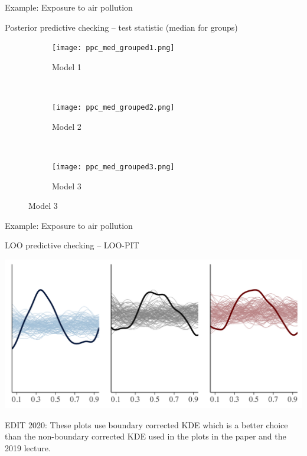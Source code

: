 \documentclass[t]{beamer}
\begin{document}
\begin{frame}

  {\Large\color{navyblue} Example: Exposure to air pollution}


  Posterior predictive checking -- test statistic (median for groups)

  \begin{figure}
\centering
\begin{subfigure}{.31\textwidth}
\texttt{[image: ppc\_med\_grouped1.png]}
\caption{Model 1}
\end{subfigure}
~
\begin{subfigure}{.31\textwidth}
\texttt{[image: ppc\_med\_grouped2.png]}
\caption{Model 2}
\end{subfigure}
~
\begin{subfigure}{.31\textwidth}
\texttt{[image: ppc\_med\_grouped3.png]}
\caption{Model 3}
\end{subfigure}

\end{figure}

\end{frame}

\begin{frame}

  {\Large\color{navyblue} Example: Exposure to air pollution}


  LOO predictive checking -- LOO-PIT

\includegraphics[width=\textwidth]{ppc_loo_pit_corrected_pm25.png}


\vspace{2\baselineskip}
{\scriptsize EDIT 2020: These plots use boundary corrected KDE which is a better
choice than the non-boundary corrected KDE used in the plots in the
paper and the 2019 lecture.}

\end{frame}
\end{document}
